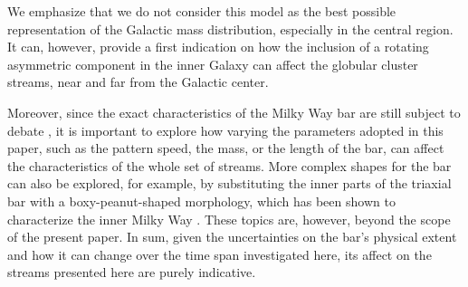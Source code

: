         We emphasize that we do not consider this model as the best possible representation of the Galactic mass distribution, especially in the central region. It can, however, provide a first indication on how the inclusion of a rotating asymmetric component in the inner Galaxy can affect the globular cluster streams, near and far from the Galactic center. 

        Moreover, since the exact characteristics of the Milky Way bar are still subject to debate \citep[see, e.g.,][]{2016ARA&A..54..529B}, it is important to explore how varying the parameters adopted in this paper, such as the pattern speed, the mass, or the length of the bar, can affect the characteristics of the whole set of streams.  More complex shapes for the bar can also be explored, for example, by substituting the inner parts of the triaxial bar with a boxy-peanut-shaped morphology, which has been shown to characterize the inner Milky Way  \citep[see, e.g., ][]{2013MNRAS.435.1874W, 2015MNRAS.450.4050W}. These topics are, however, beyond the scope of the present paper. In sum, given the uncertainties on the bar's physical extent and how it can change over the time span investigated here, its affect on the streams presented here are purely indicative. 


